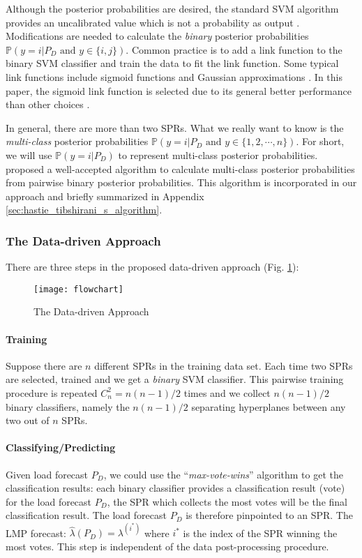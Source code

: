 \documentclass[letterpaper, 11pt]{article}
\theoremstyle{plain}
\theoremstyle{definition}
\begin{document}
Although the posterior probabilities are desired, the standard SVM algorithm provides an uncalibrated value which is not a probability as output \cite{Platt1999}. Modifications are needed to calculate the \emph{binary} posterior probabilities $\mathbb{P}( y = i | P_D \text{ and } y \in \{i,j\})$. 
Common practice is to add a link function to the binary SVM classifier and train the data to fit the link function. Some typical link functions include sigmoid functions \cite{Platt1999} and Gaussian approximations \cite{hastie1998classification}. In this paper, the sigmoid link function is selected due to its general better performance than other choices \cite{Platt1999}. 

In general, there are more than two SPRs. What we really want to know is the \emph{multi-class} posterior probabilities $\mathbb{P}( y=i | P_D \text{ and } y \in \{1,2,\cdots,n\} )$. For short, we will use $\mathbb{P}(y=i|P_D)$ to represent multi-class posterior probabilities. \cite{hastie1998classification} proposed a well-accepted algorithm to calculate multi-class posterior probabilities from pairwise binary posterior probabilities. This algorithm is incorporated in our approach and briefly summarized in Appendix \ref{sec:hastie_tibshirani_s_algorithm}.


\subsubsection{The Data-driven Approach} \label{ssub:extended_data_driven_approach}
There are three steps in the proposed data-driven approach (Fig. \ref{fig:flowchart}):
\begin{figure}[htbp]
  \centering
  \texttt{[image: flowchart]}
  \caption{The Data-driven Approach}
  \label{fig:flowchart}
\end{figure}

\paragraph{Training} \label{par:step_1}
Suppose there are $n$ different SPRs in the training data set. Each time two SPRs are selected, trained and we get a \emph{binary} SVM classifier. This pairwise training procedure is repeated $C_{n}^2 = n(n-1)/2$ times and we collect $n(n-1)/2$ binary classifiers, namely the $n(n-1)/2$ separating hyperplanes between any two out of $n$ SPRs.




\paragraph{Classifying/Predicting} \label{par:step_3}
Given load forecast $P_D$, we could use the ``\emph{max-vote-wins}'' algorithm to get the classification results:
each binary classifier provides a classification result (vote) for the load forecast $P_D$, the SPR which collects the most votes will be the final classification result. The load forecast $P_D$ is therefore pinpointed to an SPR.
The LMP forecast: 
$\hat{\lambda}(P_D) = \lambda^{(i^*)}$ where $i^*$ is the index of the SPR winning the most votes. This step is independent of the data post-processing procedure.
\end{document}
